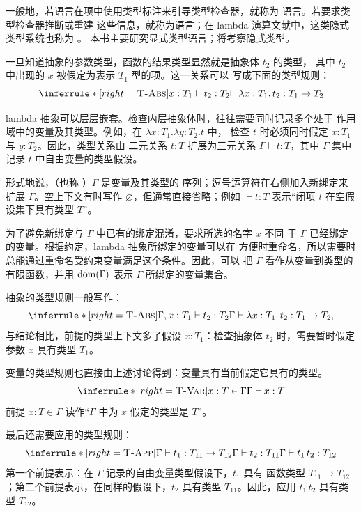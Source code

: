 一般地，若语言在项中使用类型标注来引导类型检查器，就称为
语言。若要求类型检查器推断或重建
这些信息，就称为语言；在 lambda
演算文献中，这类隐式类型系统也称为
。
本书主要研究显式类型语言；将考察隐式类型。

一旦知道抽象的参数类型，函数的结果类型显然就是抽象体 \(t_2\) 的类型，
其中 \(t_2\) 中出现的 \(x\) 被假定为表示 \(T_1\) 型的项。这一关系可以
写成下面的类型规则：
\[
\inferrule*[right=\textsc{T-Abs}]
 {x:T_1\vdash t_2:T_2}
 {\vdash\lambda x:T_1.\,t_2:T_1\to T_2}
\]

lambda 抽象可以层层嵌套。检查内层抽象体时，往往需要同时记录多个处于
作用域中的变量及其类型。例如，在 \(\lambda x:T_1.\lambda y:T_2.t\) 中，
检查 \(t\) 时必须同时假定 \(x:T_1\) 与 \(y:T_2\)。因此，类型关系由
二元关系 \(t:T\) 扩展为三元关系 \(\Gamma\vdash t:T\)，其中 \(\Gamma\)
集中记录 \(t\) 中自由变量的类型假设。

形式地说，（也称
）\(\Gamma\) 是变量及其类型的
序列；逗号运算符在右侧加入新绑定来扩展 \(\Gamma\)。空上下文有时写作
\(\varnothing\)，但通常直接省略；例如 \(\vdash t:T\) 表示“闭项 \(t\)
在空假设集下具有类型 \(T\)”。

为了避免新绑定与 \(\Gamma\) 中已有的绑定混淆，要求所选的名字 \(x\) 不同
于 \(\Gamma\) 已经绑定的变量。根据约定，lambda 抽象所绑定的变量可以在
方便时重命名，所以需要时总能通过重命名受约束变量满足这个条件。因此，可以
把 \(\Gamma\) 看作从变量到类型的有限函数，并用 \(\operatorname{dom}(\Gamma)\) 表示
\(\Gamma\) 所绑定的变量集合。

抽象的类型规则一般写作：
\[
\inferrule*[right=\textsc{T-Abs}]
 {\Gamma,x:T_1\vdash t_2:T_2}
 {\Gamma\vdash\lambda x:T_1.\,t_2:T_1\to T_2},
\]
与结论相比，前提的类型上下文多了假设 \(x:T_1\)：检查抽象体 \(t_2\)
时，需要暂时假定参数 \(x\) 具有类型 \(T_1\)。

变量的类型规则也直接由上述讨论得到：变量具有当前假定它具有的类型。
\[
\inferrule*[right=\textsc{T-Var}]
 {x:T\in\Gamma}{\Gamma\vdash x:T}
\]
前提 \(x:T\in\Gamma\) 读作“\(\Gamma\) 中为 \(x\) 假定的类型是 \(T\)”。

最后还需要应用的类型规则：
\[
\inferrule*[right=\textsc{T-App}]
 {\Gamma\vdash t_1:T_{11}\to T_{12}\\
  \Gamma\vdash t_2:T_{11}}
 {\Gamma\vdash t_1\,t_2:T_{12}}
\]
第一个前提表示：在 \(\Gamma\) 记录的自由变量类型假设下，\(t_1\) 具有
函数类型 \(T_{11}\to T_{12}\)；第二个前提表示，在同样的假设下，\(t_2\)
具有类型 \(T_{11}\)。因此，应用 \(t_1\,t_2\) 具有类型 \(T_{12}\)。

